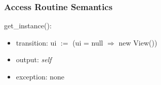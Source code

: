 \documentclass[12pt]{article}
\begin{document}
\subsubsection* {Access Routine Semantics}

\noindent get\_instance():
\begin{itemize}
\item transition: ui $:=$ (ui = null $\Rightarrow$ new View())
\item output: \textit{self}
\item exception: none
\end{itemize}






\end{document}
